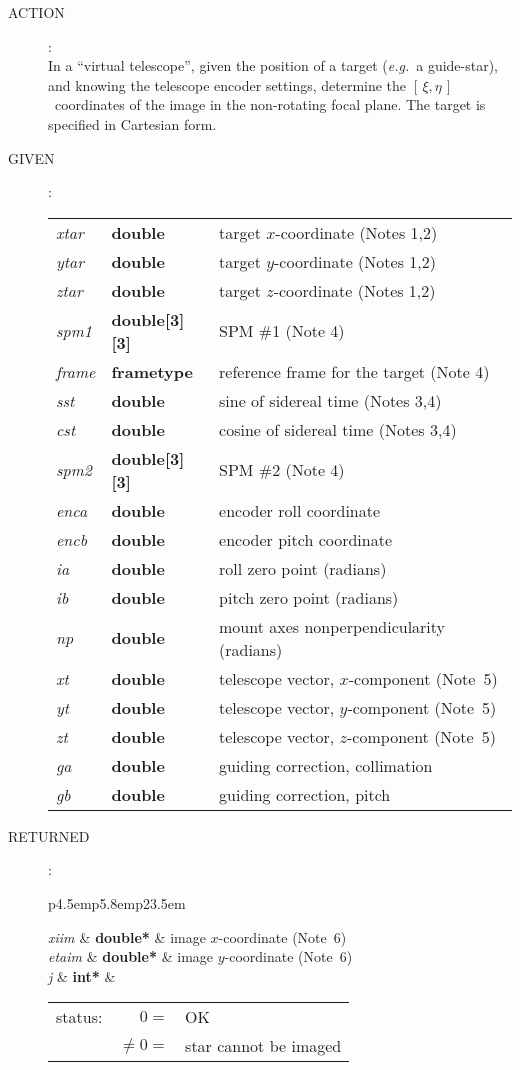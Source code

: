 \documentclass[12pt,fleqn,twoside]{article}
\renewcommand{\_}{{\tt\char'137}}     %
\newcommand{\xieta}     {$[\,\xi,\eta\,]$}
\newcommand{\action}[1]
{
  \goodbreak
  \begin{description}
    \item[ACTION]: \\[0.5ex] \nopagebreak
        #1
  \end{description}
  \vspace{-3ex}
}
\newcommand{\args}[2]
{
  \goodbreak
  \begin{description}
  \item[#1]: \\[1.5ex] \nopagebreak
    \hspace*{-0.9em}
    \begin{tabular}{p{4.5em}p{5.8em}p{23.5em}}
      #2
    \end{tabular}
  \end{description}
  \vspace{-3ex}
}
\newcommand{\spec}[3]
{
  {\em {#1}} & {\bf \mbox{#2}} & {#3}
}
\begin{document}
\action{In a ``virtual telescope'', given the
        position of a target ({\it e.g.}~a
        guide-star), and knowing the telescope encoder settings, determine
        the \xieta\ coordinates of the image in the non-rotating focal
        plane.  The target is specified in Cartesian form.}
\args{GIVEN}
{
\spec{xtar}{double}{target $x$-coordinate (Notes 1,2)} \\
\spec{ytar}{double}{target $y$-coordinate (Notes 1,2)} \\
\spec{ztar}{double}{target $z$-coordinate (Notes 1,2)} \\
\spec{spm1}{double[3][3]}{SPM \#1 (Note 4)} \\
\spec{frame}{{\sc frametype}}{reference frame for the target (Note 4)} \\
\spec{sst}{double}{sine of sidereal time (Notes 3,4)} \\
\spec{cst}{double}{cosine of sidereal time (Notes 3,4)} \\
\spec{spm2}{double[3][3]}{SPM \#2 (Note 4)} \\
\spec{enca}{double}{encoder roll coordinate} \\
\spec{encb}{double}{encoder pitch coordinate} \\
\spec{ia}{double}{roll zero point (radians)} \\
\spec{ib}{double}{pitch zero point (radians)} \\
\spec{np}{double}{mount axes nonperpendicularity (radians)} \\
\spec{xt}{double}{telescope vector, $x$-component (Note~5)} \\
\spec{yt}{double}{telescope vector, $y$-component (Note~5)} \\
\spec{zt}{double}{telescope vector, $z$-component (Note~5)} \\
\spec{ga}{double}{guiding correction, collimation} \\
\spec{gb}{double}{guiding correction, pitch}
}
\args{RETURNED}
{
\spec{xiim }{double*}{image $x$-coordinate (Note~6)} \\
\spec{etaim}{double*}{image $y$-coordinate (Note~6)} \\
\spec{j}{int*}{\hspace{-2ex}
               \begin{tabular}[t]{lrl}
                  status: & $  0 = $ & OK \\
                          & $ \neq 0 = $ & star cannot be imaged
               \end{tabular}
              }
}
\end{document}
